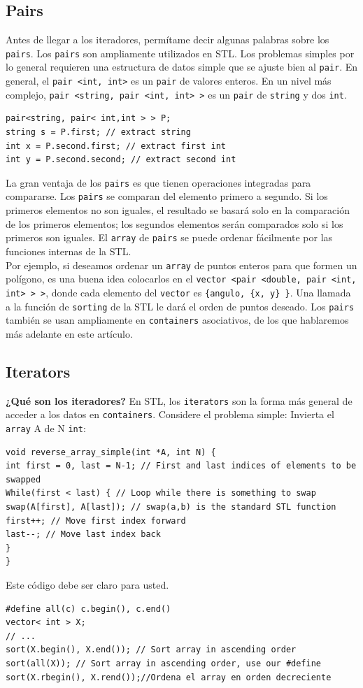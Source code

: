 \documentclass[a4paper,12pt]{article}
\begin{document}
\subsection*{Pairs}
Antes de llegar a los iteradores, permítame decir algunas palabras sobre los \texttt{pairs}. Los \texttt{pairs} son ampliamente utilizados en STL. Los problemas simples por lo general requieren una estructura de datos simple que se ajuste bien al \texttt{pair}. En general, el \texttt{pair <int, int>} es un \texttt{pair} de valores enteros. En un nivel más complejo, \texttt{pair <string, pair <int, int> >} es un \texttt{pair} de \texttt{string} y dos \texttt{int}.
\begin{lstlisting}
pair<string, pair< int,int > > P;
string s = P.first; // extract string
int x = P.second.first; // extract first int
int y = P.second.second; // extract second int
\end{lstlisting}
La gran ventaja de los \texttt{pairs} es que tienen operaciones integradas para compararse. Los \texttt{pairs} se comparan del elemento primero a segundo. Si los primeros elementos no son iguales, el resultado se basará solo en la comparación de los primeros elementos; los segundos elementos serán comparados solo si los primeros son iguales. El \texttt{array} de \texttt{pairs} se puede ordenar fácilmente por las funciones internas de la STL.\\
Por ejemplo, si deseamos ordenar un \texttt{array} de puntos enteros para que formen un polígono, es una buena idea colocarlos en el \texttt{vector <pair <double, pair <int, int> > >}, donde cada elemento del \texttt{vector} es \texttt{\{angulo, \{x, y\} \}}. Una llamada a la función de \texttt{sorting} de la STL le dará el orden de puntos deseado. Los \texttt{pairs} también se usan ampliamente en \texttt{containers} asociativos, de los que hablaremos más adelante en este artículo.
\subsection*{Iterators}
\textbf{¿Qué son los iteradores?} En STL, los \texttt{iterators} son la forma más general de acceder a los datos en \texttt{containers}. Considere el problema simple: Invierta el \texttt{array} A de N \texttt{int}:
\begin{lstlisting}
void reverse_array_simple(int *A, int N) {
int first = 0, last = N-1; // First and last indices of elements to be swapped
While(first < last) { // Loop while there is something to swap
swap(A[first], A[last]); // swap(a,b) is the standard STL function
first++; // Move first index forward
last--; // Move last index back
}
}
\end{lstlisting}
Este código debe ser claro para usted.
\begin{lstlisting}
#define all(c) c.begin(), c.end()
vector< int > X; 
// ... 
sort(X.begin(), X.end()); // Sort array in ascending order
sort(all(X)); // Sort array in ascending order, use our #define
sort(X.rbegin(), X.rend());//Ordena el array en orden decreciente
\end{lstlisting}
\end{document}

